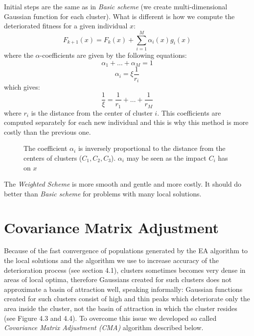 Initial steps are the same as in \textit{Basic scheme} (we create 
multi-dimensional Gaussian function for each cluster). What is different
is how we compute the deteriorated fitness for a given individual $x$:
\begin{equation}
F_{k+1}(x)=F_k(x) + \sum_{i=1}^M \alpha_i(x) g_i(x)
\end{equation}
where the $\alpha$-coefficients are given by the following equations:
\begin{equation}
	\alpha_1 + \ldots + \alpha_M = 1
\end{equation}
\begin{equation}
	\alpha_i = \xi\frac{1}{r_i}
\end{equation}
which gives:
\begin{equation}
\frac{1}{\xi}=\frac{1}{r_1} + \ldots + \frac{1}{r_M}
\end{equation}
where $r_i$ is the distance from the center of cluster $i$. This coefficients
are computed separately for each new individual and this is why this method is
more costly than the previous one.
\begin{figure}
  \centering
  \caption{The coefficient $\alpha_i$ is inversely proportional to the
  distance from the centers of clusters ($C_1, C_2, C_3$). $\alpha_i$ may be
  seen as the impact $C_i$ has on $x$}
  \label{det1}
\end{figure}


The \textit{Weighted Scheme} is more smooth and gentle and more costly.
It should do better than \textit{Basic scheme} for problems with many local
solutions. 

\section{Covariance Matrix Adjustment}
Because of the fast convergence of populations
generated by the EA algorithm to the local solutions and the algorithm we use
to increase accuracy of the deterioration process (see section 4.1),
clusters sometimes becomes very dense in areas of local optima, therefore Gaussians created for such
clusters does not approximate a basin of attraction well, speaking informally:
Gaussian functions created for such clusters consist of high and thin peaks
which deteriorate only the area inside the cluster, not the basin of attraction
in which the cluster resides (see Figure 4.3 and 4.4).
To overcome this issue we developed so called \textit{Covariance Matrix
Adjustment (CMA)} algorithm described below.

